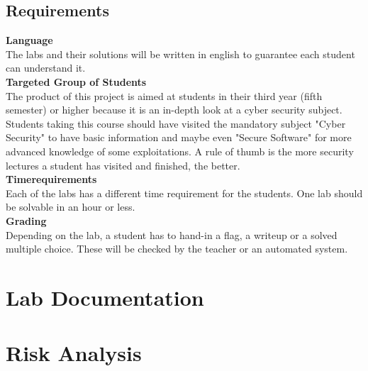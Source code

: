 \subsection{Requirements}
\textbf{Language} \\
The labs and their solutions will be written in english to guarantee each student can understand it. \\[0.5cm]
\textbf{Targeted Group of Students} \\
The product of this project is aimed at students in their third year (fifth semester) or higher because it is an in-depth look at a cyber security subject. Students taking this course should have visited the mandatory subject "Cyber Security" to have basic information and maybe even "Secure Software" for more advanced knowledge of some exploitations. A rule of thumb is the more security lectures a student has visited and finished, the better. \\[0.5cm]
\textbf{Timerequirements} \\
Each of the labs has a different time requirement for the students. One lab should be solvable in an hour or less.  \\[0.5cm]
\textbf{Grading} \\
Depending on the lab, a student has to hand-in a flag, a writeup or a solved multiple choice. These will be checked by the teacher or an automated system. \\[0.5cm]

\section{Lab Documentation}


\section{Risk Analysis}

